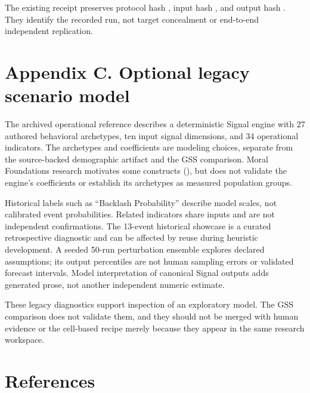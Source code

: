 \documentclass[
  11pt,
]{article}
\let\originalsection\section
\renewcommand{\section}{\Needspace{5\baselineskip}\originalsection}
\begin{document}
The existing receipt preserves protocol hash
\texttt{},
input hash
\texttt{},
and output hash
\texttt{}.
They identify the recorded run, not target concealment or end-to-end
independent replication.

\section*{Appendix C. Optional legacy scenario
model}\label{appendix-c.-optional-legacy-scenario-model}

The archived operational reference describes a deterministic Signal
engine with 27 authored behavioral archetypes, ten input signal
dimensions, and 34 operational indicators. The archetypes and
coefficients are modeling choices, separate from the source-backed
demographic artifact and the GSS comparison. Moral Foundations research
motivates some constructs (),
but does not validate the engine's coefficients or establish its
archetypes as measured population groups.

Historical labels such as ``Backlash Probability'' describe model
scales, not calibrated event probabilities. Related indicators share
inputs and are not independent confirmations. The 13-event historical
showcase is a curated retrospective diagnostic and can be affected by
reuse during heuristic development. A seeded 50-run perturbation
ensemble explores declared assumptions; its output percentiles are not
human sampling errors or validated forecast intervals. Model
interpretation of canonical Signal outputs adds generated prose, not
another independent numeric estimate.

These legacy diagnostics support inspection of an exploratory model. The
GSS comparison does not validate them, and they should not be merged
with human evidence or the cell-based recipe merely because they appear
in the same research workspace.

\section*{References}\label{references}
\end{document}
